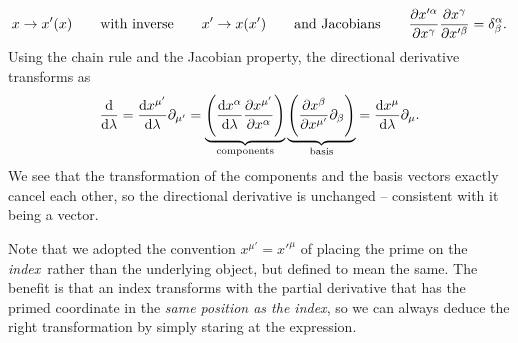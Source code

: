 \begin{equation}
	x \rightarrow x'(x)
	\qquad \text{with inverse} \qquad
	x' \rightarrow x(x')
	\qquad \text{and Jacobians} \qquad
	\pdv{x'^{\alpha}}{x^\gamma} \pdv{x^{\gamma}}{x'^{\beta}} = \delta^{\alpha}_{\beta} .
	\label{eq:gr_summary:coordinate_transformation}
\end{equation}
Using the chain rule and the Jacobian property, the directional derivative transforms as
\begin{equation}
	\odv{}{\lambda} = \odv{x^{\mu'}}{\lambda} \partial_{\mu'} = \underbrace{\Bigg( \odv{x^{\alpha}}{\lambda} \pdvx{\mu'}{\alpha} \Bigg)}_\text{components} \underbrace{\Bigg( \pdvx{\beta}{\mu'} \partial_{\beta} \Bigg)}_\text{basis} = \odv{x^{\mu}}{\lambda} \partial_{\mu} .
\end{equation}
We see that the transformation of the components and the basis vectors exactly cancel each other, so the directional derivative is unchanged -- consistent with it being a vector.

Note that we adopted the convention $x^{\mu'} = x'^\mu$ of placing the prime on the \emph{index} rather than the underlying object, but defined to mean the same.
The benefit is that an index transforms with the partial derivative that has the primed coordinate in the \emph{same position as the index}, so we can always deduce the right transformation by simply staring at the expression.

